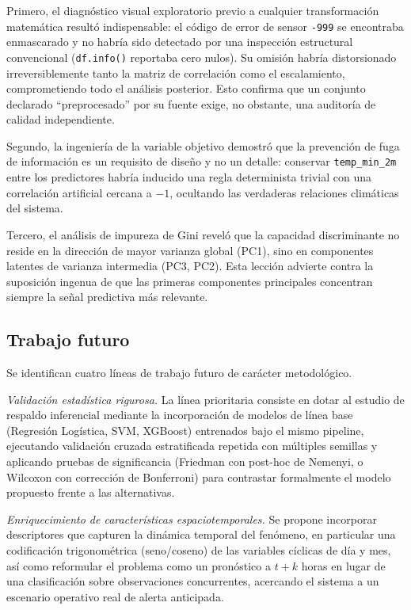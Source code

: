 Primero, el diagnóstico visual exploratorio previo a cualquier transformación
matemática resultó indispensable: el código de error de sensor \texttt{-999} se
encontraba enmascarado y no habría sido detectado por una inspección estructural
convencional (\texttt{df.info()} reportaba cero nulos). Su omisión habría
distorsionado irreversiblemente tanto la matriz de correlación como el
escalamiento, comprometiendo todo el análisis posterior. Esto confirma que un
conjunto declarado ``preprocesado'' por su fuente exige, no obstante, una
auditoría de calidad independiente.

Segundo, la ingeniería de la variable objetivo demostró que la prevención de fuga
de información es un requisito de diseño y no un detalle: conservar
\texttt{temp\_min\_2m} entre los predictores habría inducido una regla
determinista trivial con una correlación artificial cercana a $-1$, ocultando las
verdaderas relaciones climáticas del sistema.

Tercero, el análisis de impureza de Gini reveló que la capacidad discriminante no
reside en la dirección de mayor varianza global (PC1), sino en componentes
latentes de varianza intermedia (PC3, PC2). Esta lección advierte contra la
suposición ingenua de que las primeras componentes principales concentran
siempre la señal predictiva más relevante.

\subsection{Trabajo futuro}
Se identifican cuatro líneas de trabajo futuro de carácter metodológico.

\emph{Validación estadística rigurosa.} La línea prioritaria consiste en dotar al
estudio de respaldo inferencial mediante la incorporación de modelos de línea base
(Regresión Logística, SVM, XGBoost) entrenados bajo el mismo pipeline, ejecutando
validación cruzada estratificada repetida con múltiples semillas y aplicando
pruebas de significancia (Friedman con post-hoc de Nemenyi, o Wilcoxon con
corrección de Bonferroni) para contrastar formalmente el modelo propuesto frente a
las alternativas.

\emph{Enriquecimiento de características espaciotemporales.} Se propone incorporar
descriptores que capturen la dinámica temporal del fenómeno, en particular una
codificación trigonométrica (seno/coseno) de las variables cíclicas de día y mes,
así como reformular el problema como un pronóstico a $t+k$ horas en lugar de una
clasificación sobre observaciones concurrentes, acercando el sistema a un
escenario operativo real de alerta anticipada.


